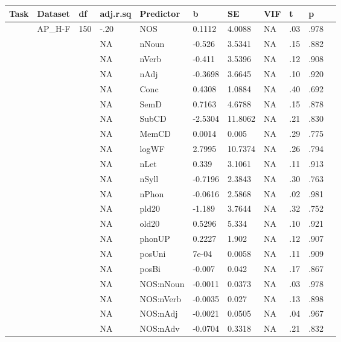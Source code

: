 \begin{table}[ht]
\centering
\begingroup\normalsize
\begin{tabular}{lllllllllll}
  \hline
Task & Dataset & df & adj.r.sq & Predictor & b & SE & VIF & t & p &  \\ 
  \hline
 & AP\_H-F & 150 & -.20 & NOS & 0.1112 & 4.0088 & NA & .03 & .978 &   \\ 
   &  &  & NA & nNoun & -0.526 & 3.5341 & NA & .15 & .882 &   \\ 
   &  &  & NA & nVerb & -0.411 & 3.5396 & NA & .12 & .908 &   \\ 
   &  &  & NA & nAdj & -0.3698 & 3.6645 & NA & .10 & .920 &   \\ 
   &  &  & NA & Conc & 0.4308 & 1.0884 & NA & .40 & .692 &   \\ 
   &  &  & NA & SemD & 0.7163 & 4.6788 & NA & .15 & .878 &   \\ 
   &  &  & NA & SubCD & -2.5304 & 11.8062 & NA & .21 & .830 &   \\ 
   &  &  & NA & MemCD & 0.0014 & 0.005 & NA & .29 & .775 &   \\ 
   &  &  & NA & logWF & 2.7995 & 10.7374 & NA & .26 & .794 &   \\ 
   &  &  & NA & nLet & 0.339 & 3.1061 & NA & .11 & .913 &   \\ 
   &  &  & NA & nSyll & -0.7196 & 2.3843 & NA & .30 & .763 &   \\ 
   &  &  & NA & nPhon & -0.0616 & 2.5868 & NA & .02 & .981 &   \\ 
   &  &  & NA & pld20 & -1.189 & 3.7644 & NA & .32 & .752 &   \\ 
   &  &  & NA & old20 & 0.5296 & 5.334 & NA & .10 & .921 &   \\ 
   &  &  & NA & phonUP & 0.2227 & 1.902 & NA & .12 & .907 &   \\ 
   &  &  & NA & posUni & 7e-04 & 0.0058 & NA & .11 & .909 &   \\ 
   &  &  & NA & posBi & -0.007 & 0.042 & NA & .17 & .867 &   \\ 
   &  &  & NA & NOS:nNoun & -0.0011 & 0.0373 & NA & .03 & .978 &   \\ 
   &  &  & NA & NOS:nVerb & -0.0035 & 0.027 & NA & .13 & .898 &   \\ 
   &  &  & NA & NOS:nAdj & -0.0021 & 0.0505 & NA & .04 & .967 &   \\ 
   &  &  & NA & NOS:nAdv & -0.0704 & 0.3318 & NA & .21 & .832 &   \\ 

\end{tabular}
\end{table}
